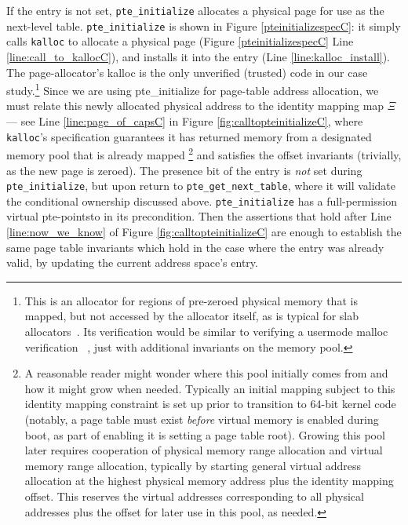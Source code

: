 If the entry is not set, \lstinline|pte_initialize|  
allocates a physical page for use as the next-level table.
\lstinline|pte_initialize| is shown in Figure \ref{pteinitializespecC}: it simply calls
\lstinline|kalloc| to allocate a physical page (Figure \ref{pteinitializespecC} Line \ref{line:call_to_kallocC}),
and installs it into the entry (Line \ref{line:kalloc_install}).
The page-allocator's \textsf{kalloc}
is the only unverified (trusted) code in our case study.\footnote{
  This is an allocator for regions of pre-zeroed physical memory that is mapped, but not accessed by the allocator itself,
  as is typical for slab allocators~\cite{bonwick1994slab}.
  Its verification would be similar to verifying a usermode \textsf{malloc} verification ~\cite{Chlipala2013Bedrock,wickerson2010explicit},
  just with additional invariants on the memory pool.
} 
Since we are using \textsf{pte\_initialize} for page-table address allocation, we must relate this newly
allocated physical address to the identity mapping map $\Xi$ --- 
see Line \ref{line:page_of_capsC} in Figure \ref{fig:calltopteinitializeC}, where
\texttt{kalloc}'s specification guarantees it has returned memory from a designated memory
pool that is already mapped
\footnote{A reasonable reader might wonder where this pool
initially comes from and how it might grow when needed. Typically an initial mapping subject to this identity mapping
constraint is set up prior to transition to 64-bit kernel code (notably,
a page table must exist \emph{before} virtual memory is enabled during boot, as part of enabling it is setting
a page table root).
Growing this pool later requires cooperation of physical memory range allocation and virtual memory range allocation,
typically by starting general virtual address allocation at the highest physical memory address plus the identity mapping offset.
This reserves the virtual addresses corresponding to all physical addresses plus the offset for later use in this pool,
as needed.
} 
and satisfies the offset invariants (trivially, as the new page is zeroed).
The presence bit of the entry is \emph{not} set during \lstinline|pte_initialize|, but upon
return to \lstinline|pte_get_next_table|, where it will validate the conditional ownership discussed above.
\lstinline|pte_initialize| has a full-permission virtual pte-pointsto in its precondition.
Then the assertions that hold after Line \ref{line:now_we_know} of Figure \ref{fig:calltopteinitializeC}
are enough to establish the same page table invariants which hold in the case where the entry was already valid,
by updating the current address space's entry.



